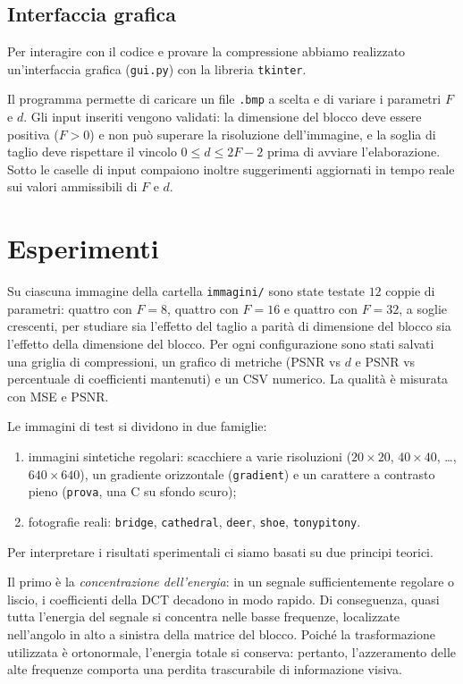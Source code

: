 \documentclass[11pt,a4paper]{article}
\makeatletter
\let\@origtexttt\texttt
\renewcommand{\texttt}[1]{{\def\_{\textunderscore\discretionary{}{}{}}\@origtexttt{#1}}}
\makeatother
\begin{document}
\subsection{Interfaccia grafica}

Per interagire con il codice e provare la compressione abbiamo realizzato un'interfaccia grafica (\texttt{gui.py}) con la libreria \texttt{tkinter}.

Il programma permette di caricare un file \texttt{.bmp} a scelta e di
variare i parametri $F$ e $d$. Gli input inseriti vengono validati: la
dimensione del blocco deve essere positiva ($F > 0$) e non può superare la risoluzione dell'immagine, e
la soglia di taglio deve rispettare il vincolo $0 \le d \le 2F-2$ prima di avviare l'elaborazione.
Sotto le caselle di input compaiono inoltre suggerimenti aggiornati in tempo reale sui valori ammissibili di $F$ e $d$.

\section{Esperimenti}\label{sec:esperimenti}

Su ciascuna immagine della cartella \texttt{immagini/} sono state testate
$12$ coppie di parametri: quattro con $F=8$, quattro con $F=16$ e quattro con
$F=32$, a soglie crescenti, per studiare sia l'effetto del taglio a parità di
dimensione del blocco sia l'effetto della dimensione del blocco. Per ogni
configurazione sono stati salvati una griglia di compressioni, un grafico di
metriche (PSNR vs $d$ e PSNR vs percentuale di coefficienti mantenuti) e un
CSV numerico. La qualità è misurata con MSE e PSNR.

Le immagini di test si dividono in due famiglie:
\begin{enumerate}
  \item immagini sintetiche regolari: scacchiere a varie risoluzioni
        ($20\times20$, $40\times40$, \dots, $640\times640$), un gradiente
        orizzontale (\texttt{gradient}) e un carattere a contrasto pieno
        (\texttt{prova}, una \guillemotleft C\guillemotright{} su sfondo scuro);
  \item fotografie reali: \texttt{bridge}, \texttt{cathedral}, \texttt{deer},
        \texttt{shoe}, \texttt{tonypitony}.
\end{enumerate}


Per interpretare i risultati sperimentali ci siamo basati su due principi teorici.

Il primo è la \emph{concentrazione dell'energia}: in un segnale sufficientemente regolare o
liscio, i coefficienti della DCT decadono in modo rapido. Di conseguenza, quasi tutta l'energia del segnale
si concentra nelle basse frequenze, localizzate nell'angolo in alto a sinistra della matrice del blocco.
Poiché la trasformazione utilizzata è ortonormale, l'energia totale si conserva: pertanto,
l'azzeramento delle alte frequenze comporta una perdita trascurabile di
informazione visiva.
\end{document}
